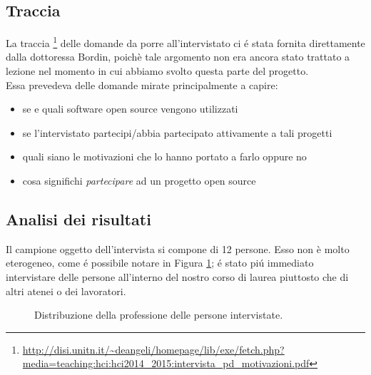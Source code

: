 \documentclass[12pt]{article} %
\begin{document}
\subsection{Traccia}
La traccia \footnote{\url{http://disi.unitn.it/~deangeli/homepage/lib/exe/fetch.php?media=teaching:hci:hci2014_2015:intervista_pd_motivazioni.pdf}} delle domande da porre all'intervistato ci \'e stata fornita direttamente dalla dottoressa Bordin, poich\`e tale argomento non era ancora stato trattato a lezione nel momento in cui abbiamo svolto questa parte del progetto.\\
Essa prevedeva delle domande mirate principalmente a capire:
\begin{itemize}
\item se e quali software open source vengono utilizzati
\item se l'intervistato partecipi/abbia partecipato attivamente a tali progetti
\item quali siano le motivazioni che lo hanno portato a farlo oppure no
\item cosa significhi \emph{partecipare} ad un progetto open source
\end{itemize}
\subsection{Analisi dei risultati}
Il campione oggetto dell'intervista si compone di 12 persone. Esso non è molto eterogeneo, come \'e possibile notare in Figura \ref{fig:distribuzione}; \'e stato pi\'u immediato intervistare delle persone all'interno del nostro corso di laurea piuttosto che di altri atenei o dei lavoratori.

\begin{figure}[H] 
\caption{Distribuzione della professione delle persone intervistate.}
\label{fig:distribuzione}
\end{figure}
\end{document}
